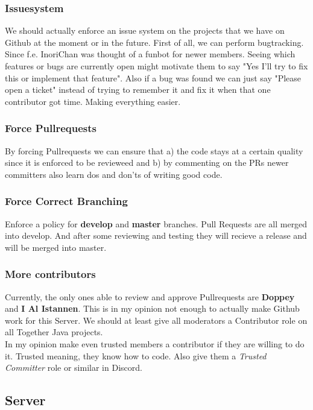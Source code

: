 \documentclass{article}
\begin{document}
    \subsubsection{Issuesystem}
    We should actually enforce an issue system on the projects that we have on Github at the moment or in the future. 
    First of all, we can perform bugtracking. Since f.e. InoriChan was thought of a funbot for newer members. Seeing which features or 
    bugs are currently open might motivate them to say "Yes I'll try to fix this or implement that feature". Also if a bug was found we can just say 
    "Please open a ticket" instead of trying to remember it and fix it when that one contributor got time. Making everything easier.

    \subsubsection{Force Pullrequests}
    \label{sec:forcepullrequests}
    By forcing Pullrequests we can ensure that a) the code stays at a certain quality since it is enforced to be revieweed and 
    b) by commenting on the PRs newer committers also learn dos and don'ts of writing good code.

    \subsubsection{Force Correct Branching}
    \label{sec:forcecorrectbranching}
    Enforce a policy for \textbf{develop} and \textbf{master} branches. Pull Requests are all merged into develop. 
    And after some reviewing and testing they will recieve a release and will be merged into master.

    \subsubsection{More contributors}
    Currently, the only ones able to review and approve Pullrequests are \textbf{Doppey} and \textbf{I Al Istannen}. 
    This is in my opinion not enough to actually make Github work for this Server. 
    We should at least give all moderators a Contributor role on all Together Java projects. \\
    In my opinion make even trusted members a contributor if they are willing to do it. 
    Trusted meaning, they know how to code. Also give them a \textit{Trusted Committer} role or similar in Discord.

    \subsection{Server}
\end{document}
